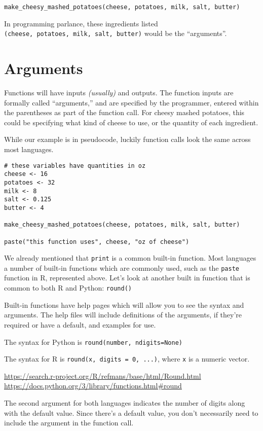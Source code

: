 \documentclass[
]{book}
\begin{document}
\begin{verbatim}
make_cheesy_mashed_potatoes(cheese, potatoes, milk, salt, butter)
\end{verbatim}

In programming parlance, these ingredients listed \texttt{(cheese,\ potatoes,\ milk,\ salt,\ butter)} would be the ``arguments''.

\section{Arguments}\label{arguments}

Functions will have inputs \emph{(usually)} and outputs. The function inputs are formally called ``arguments,'' and are specified by the programmer, entered within the parentheses as part of the function call. For cheesy mashed potatoes, this could be specifying what kind of cheese to use, or the quantity of each ingredient.

While our example is in pseudocode, luckily function calls look the same across most languages.

\begin{verbatim}
# these variables have quantities in oz
cheese <- 16
potatoes <- 32
milk <- 8
salt <- 0.125
butter <- 4

make_cheesy_mashed_potatoes(cheese, potatoes, milk, salt, butter)

paste("this function uses", cheese, "oz of cheese")
\end{verbatim}

We already mentioned that \texttt{print} is a common built-in function. Most languages a number of built-in functions which are commonly used, such as the \texttt{paste} function in R, represented above. Let's look at another built in function that is common to both R and Python: \texttt{round()}

Built-in functions have help pages which will allow you to see the syntax and arguments. The help files will include definitions of the arguments, if they're required or have a default, and examples for use.

The syntax for Python is \texttt{round(number,\ ndigits=None)}

The syntax for R is \texttt{round(x,\ digits\ =\ 0,\ ...)}, where \texttt{x} is a numeric vector.

\url{https://search.r-project.org/R/refmans/base/html/Round.html}
\url{https://docs.python.org/3/library/functions.html\#round}

The second argument for both languages indicates the number of digits along with the default value. Since there's a default value, you don't necessarily need to include the argument in the function call.
\end{document}
